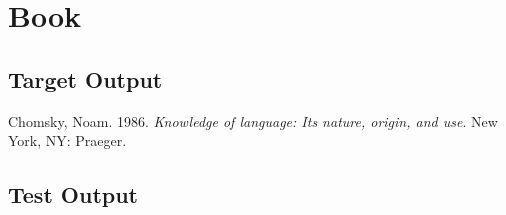 \documentclass{article}
\begin{document}
\section{Book}

\subsection{Target Output}

\begin{hangparas}{15pt}{1}
	
Chomsky, Noam. 1986. \textit{Knowledge of language: Its nature, origin, and use}. New York, NY: Praeger.

\end{hangparas}

\subsection{Test Output}

\nocite{chomsky1986:knowledge}

\printbibliography[
heading=none
]
\end{document}
